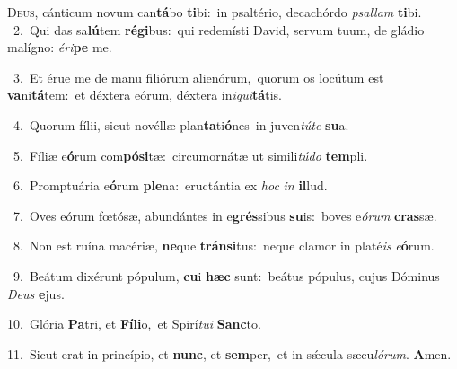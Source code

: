 \lettrine{\initial\textcolor{\initialcolor}{D}}{eus,} cánticum novum can\-\textbf{tá}\-bo \textbf{ti}\-bi:~\star in psaltério, decachórdo \textit{psal}\-\textit{lam} \textbf{ti}\-bi.\\
{\numbfont\textcolor{\numbcolor}{~2.}}~Qui das sa\-\textbf{lú}\-tem \textbf{ré}\-\textbf{gi}bus:~\star qui redemísti David, servum tuum, de gládio malígno: \textit{é}\-\textit{ri}\textbf{pe} me.\par
{\numbfont\textcolor{\numbcolor}{~3.}}~Et érue me de manu filiórum alienórum,~\dagger quorum os locútum est \textbf{va}\-ni\-\textbf{tá}\-tem:~\star et déxtera eórum, déxtera in\-\textit{i}\-\textit{qui}\textbf{tá}tis.\par
{\numbfont\textcolor{\numbcolor}{~4.}}~Quorum fílii, sicut novéllæ plan\-\textbf{ta}\-ti\-\textbf{ó}\-nes~\star in juven\-\textit{tú}\-\textit{te} \textbf{su}\-a.\par
{\numbfont\textcolor{\numbcolor}{~5.}}~Fíliæ e\-\textbf{ó}\-rum com\-\textbf{pó}\-\textbf{si}tæ:~\star circumornátæ ut simili\-\textit{tú}\-\textit{do} \textbf{tem}\-pli.\par
{\numbfont\textcolor{\numbcolor}{~6.}}~Promptuária e\-\textbf{ó}\-rum \textbf{ple}\-na:~\star eructántia ex \textit{hoc} \textit{in} \textbf{il}\-lud.\par
{\numbfont\textcolor{\numbcolor}{~7.}}~Oves eórum fœtósæ, abundántes in e\-\textbf{grés}\-sibus \textbf{su}\-is:~\star boves e\-\textit{ó}\-\textit{rum} \textbf{cras}\-sæ.\par
{\numbfont\textcolor{\numbcolor}{~8.}}~Non est ruína macériæ, \textbf{ne}\-que \textbf{tráns}\-\textbf{i}tus:~\star neque clamor in platé\textit{is} \textit{e}\-\textbf{ó}rum.\par
{\numbfont\textcolor{\numbcolor}{~9.}}~Beátum dixérunt pópulum, \textbf{cu}\-i \textbf{hæc} sunt:~\star beátus pópulus, cujus Dóminus \textit{De}\-\textit{us} \textbf{e}\-jus.\par
{\numbfont\textcolor{\numbcolor}{10.}}~Glória \textbf{Pa}\-tri, et \textbf{Fí}\-\textbf{li}o,~\star et Spirí\-\textit{tu}\-\textit{i} \textbf{Sanc}\-to.\par
{\numbfont\textcolor{\numbcolor}{11.}}~Sicut erat in princípio, et \textbf{nunc}\-, et \textbf{sem}\-per,~\star et in sǽcula sæcu\-\textit{ló}\-\textit{rum}. \textbf{A}\-men.\par

